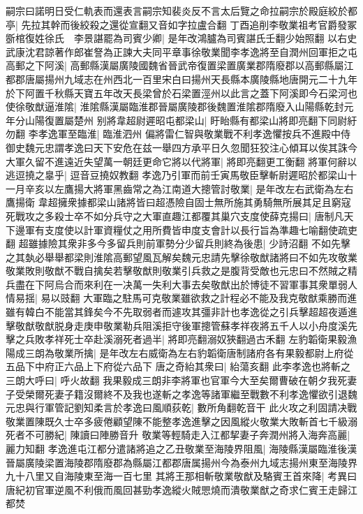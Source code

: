 嗣宗曰諾明日受仁軌表而還表言嗣宗知裴炎反不言太后覽之命拉嗣宗於殿庭絞於都亭|{
	先拉其幹而後絞殺之還從宣翻又音如字拉盧合翻}
丁酉追削李敬業祖考官爵發冢斵棺復姓徐氏　李景諶罷為司賓少卿|{
	是年改鴻臚為司賓諶氏壬翻少始照翻}
以右史武康沈君諒著作郎崔詧為正諫大夫同平章事徐敬業聞李孝逸將至自潤州回軍拒之屯高郵之下阿溪|{
	高郵縣漢屬廣陵國魏省晉武帝復置梁置廣業郡隋廢郡以高郵縣屬江都郡唐屬揚州九域志在州西北一百里宋白曰揚州天長縣本廣陵縣地唐開元二十九年於下阿置千秋縣天寶五年改天長梁曾於石梁置涇州以此言之蓋下阿溪即今石梁河也}
使徐敬猷逼淮隂|{
	淮隂縣漢屬臨淮郡晉屬廣陵郡後魏置淮隂郡隋廢入山陽縣乾封元年分山陽復置屬楚州}
别將韋超尉遲昭屯都梁山|{
	盱眙縣有都梁山將即亮翻下同尉紆勿翻}
李孝逸軍至臨淮|{
	臨淮泗州}
偏將雷仁智與敬業戰不利孝逸懼按兵不進殿中侍御史魏元忠謂孝逸曰天下安危在兹一舉四方承平日久忽聞狂狡注心傾耳以俟其誅今大軍久留不進遠近失望萬一朝廷更命它將以代將軍|{
	將即亮翻更工衡翻}
將軍何辭以逃逗撓之辠乎|{
	逗音豆撓奴教翻}
孝逸乃引軍而前壬寅馬敬臣擊斬尉遲昭於都梁山十一月辛亥以左鷹揚大將軍黑齒常之為江南道大摠管討敬業|{
	是年改左右武衛為左右鷹揚衛}
韋超擁衆據都梁山諸將皆曰超憑險自固士無所施其勇騎無所展其足且窮寇死戰攻之多殺士卒不如分兵守之大軍直趣江都覆其巢穴支度使薛克揚曰|{
	唐制凡天下邊軍有支度使以計軍資糧仗之用所費皆申度支會計以長行旨為準趣七喻翻使疏吏翻}
超雖據險其衆非多今多留兵則前軍勢分少留兵則終為後患|{
	少詩沼翻}
不如先擊之其埶必舉舉都梁則淮隂高郵望風瓦解矣魏元忠請先擊徐敬猷諸將曰不如先攻敬業敬業敗則敬猷不戰自擒矣若擊敬猷則敬業引兵救之是腹背受敵也元忠曰不然賊之精兵盡在下阿烏合而來利在一决萬一失利大事去矣敬猷出於博徒不習軍事其衆單弱人情易揺|{
	易以豉翻}
大軍臨之駐馬可克敬業雖欲救之計程必不能及我克敬猷乘勝而進雖有韓白不能當其鋒矣今不先取弱者而遽攻其彊非計也孝逸從之引兵擊超超夜遁進擊敬猷敬猷脱身走庚申敬業勒兵阻溪拒守後軍摠管蘇孝祥夜將五千人以小舟度溪先擊之兵敗孝祥死士卒赴溪溺死者過半|{
	將即亮翻溺奴狹翻過古禾翻}
左豹韜衛果毅漁陽成三朗為敬業所擒|{
	是年改左右威衛為左右豹韜衛唐制諸府各有果毅都尉上府從五品下中府正六品上下府從六品下}
唐之奇紿其衆曰|{
	紿蕩亥翻}
此李孝逸也將斬之三朗大呼曰|{
	呼火故翻}
我果毅成三朗非李將軍也官軍今大至矣爾曹破在朝夕我死妻子受榮爾死妻子籍沒爾終不及我也遂斬之孝逸等諸軍繼至戰數不利孝逸懼欲引退魏元忠與行軍管記劉知柔言於孝逸曰風順荻乾|{
	數所角翻乾音干}
此火攻之利固請决戰敬業置陳既久士卒多疲倦顧望陳不能整孝逸進擊之因風縱火敬業大敗斬首七千級溺死者不可勝紀|{
	陳讀曰陣勝音升}
敬業等輕騎走入江都挈妻子奔潤州將入海奔高麗|{
	麗力知翻}
孝逸進屯江都分遣諸將追之乙丑敬業至海陵界阻風|{
	海陵縣漢屬臨淮後漢晉屬廣陵梁置海陵郡隋廢郡為縣屬江都郡唐属揚州今為泰州九域志揚州東至海陵界九十八里又自海陵東至海一百七里}
其將王那相斬敬業敬猷及駱賓王首來降|{
	考異曰唐紀初官軍逆風不利俄而風回甚勁孝逸縱火賊愳燒而潰敬業猷之奇求仁賓王走歸江都焚}


